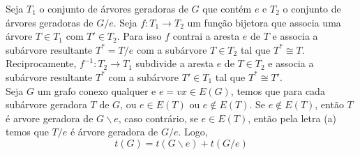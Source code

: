 
 Seja $T_1$ o conjunto de árvores geradoras de $G$ que contém $e$ e
$T_2$ o conjunto de árvores geradoras de $G/e$. Seja $f: T_1 \to T_2$ um função
bijetora  que associa uma árvore $T \in T_1$ com $T' \in T_2$. Para isso $f$
contrai a aresta $e$ de $T$ e associa a subárvore resultante $T^* = T/e$ com a
subárvore $T \in T_2$ tal que $T^* \cong T$. Reciprocamente, $f^{-1}: T_2 \to
T_1$ subdivide a aresta $e$ de $T \in T_2$ e associa a subárvore resultante $T^*$ com a subárvore $T' \in T_1$ tal que $T^* \cong T'$.\\

 Seja $G$ um grafo conexo qualquer e $e = vx \in E(G)$, temos que para cada subárvore geradora $T$ de $G$, ou $e \in E(T)$ ou $e \notin E(T)$.
%
Se $e \notin E(T)$, então $T$ é arvore geradora de $G\backslash e$, caso contrário, se $e \in E(T)$, então pela letra (a) temos que $T/e$ é árvore geradora de $G/e$.
%
Logo, $$t(G) = t(G\backslash e) + t(G/e)$$
\fimprova

